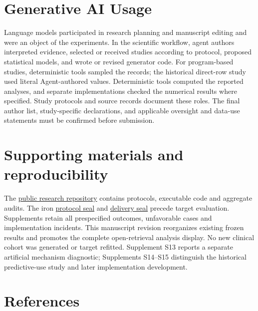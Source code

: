 \documentclass[11pt,letterpaper]{article}
\begin{document}
\section{Generative AI Usage}

Language models participated in research planning and manuscript editing and were an object of the experiments. In the scientific workflow, agent authors interpreted evidence, selected or received studies according to protocol, proposed statistical models, and wrote or revised generator code. For program-based studies, deterministic tools sampled the records; the historical direct-row study used literal Agent-authored values. Deterministic tools computed the reported analyses, and separate implementations checked the numerical results where specified. Study protocols and source records document these roles. The final author list, study-specific declarations, and applicable oversight and data-use statements must be confirmed before submission.


\section*{Supporting materials and reproducibility}

The \href{https://github.com/ziwang11112/evidence-guided-virtual-cohorts-2026}{public research repository} contains protocols, executable code and aggregate audits. The iron \href{https://github.com/ziwang11112/evidence-guided-virtual-cohorts-2026/commit/bedd845768c1c938768f58fce685f53cbf97f3df}{protocol seal} and \href{https://github.com/ziwang11112/evidence-guided-virtual-cohorts-2026/commit/c88192edeb0bc63b60d0bfe6e3a7282ced9d2975}{delivery seal} precede target evaluation. Supplements retain all prespecified outcomes, unfavorable cases and implementation incidents. This manuscript revision reorganizes existing frozen results and promotes the complete open-retrieval analysis display. No new clinical cohort was generated or target refitted. Supplement S13 reports a separate artificial mechanism diagnostic; Supplements S14–\allowbreak{}S15 distinguish the historical predictive-use study and later implementation development.


\clearpage

\section*{References}

\begingroup
\end{document}
